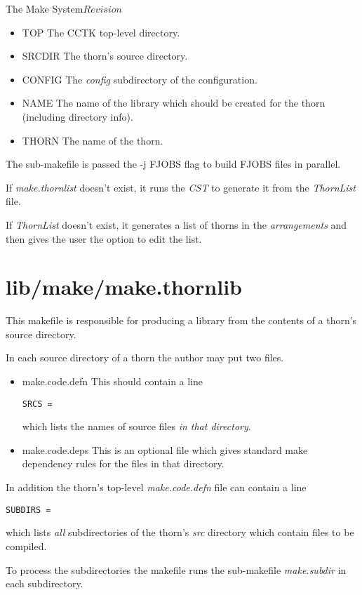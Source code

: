 \begin{cactuspart}{3}{The Make System}{}{$Revision$}
\begin{itemize}
\item{TOP}
The CCTK top-level directory.
\item{SRCDIR}
The thorn's source directory.
\item{CONFIG}
The {\em config} subdirectory of the configuration. 
\item{NAME}
The name of the library which should be created for the thorn
(including directory info).
\item{THORN}
The name of the thorn.
\end{itemize}

The sub-makefile is passed the -j FJOBS flag to build FJOBS files in parallel.

If {\em make.thornlist} doesn't exist, it runs the {\em CST} to generate it from
the {\em ThornList} file.

If {\em ThornList} doesn't exist, it generates a list of thorns in the 
{\em arrangements} and then gives the user the option to edit the
list.

\section{lib/make/make.thornlib}
\label{sec:makefiles:thornlib}

This makefile is responsible for producing a library from the contents of a
thorn's source directory.

In each source directory of a thorn the author may put two files.

\begin{itemize}
\item{make.code.defn}
This should contain a line
\begin{verbatim}
SRCS = 
\end{verbatim}
which lists the names of source files {\em in that directory}.
\item{make.code.deps}
This is an optional file which gives standard make dependency rules
for the files in that directory.
\end{itemize}

In addition the thorn's top-level {\em make.code.defn} file can
contain a line
\begin{verbatim}
SUBDIRS = 
\end{verbatim}

which lists {\em all} subdirectories of the thorn's {\em src} directory which
contain files to be compiled.

To process the subdirectories the makefile runs the sub-makefile {\em make.subdir}
in each subdirectory. 


\end{cactuspart}
